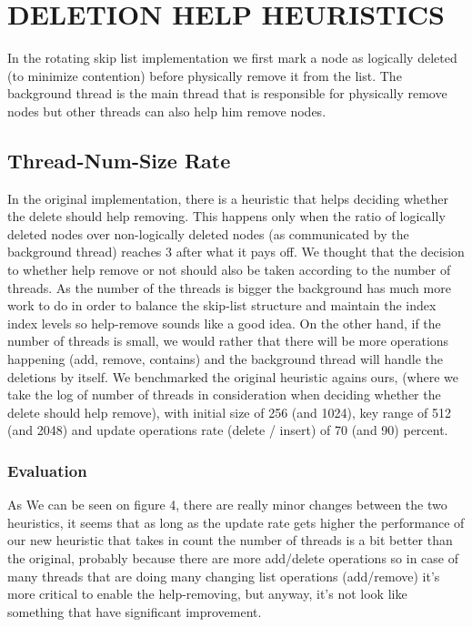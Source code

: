 \documentclass{article}
\begin{document}
\section{DELETION HELP HEURISTICS}
\label{sec:dhh}

In the rotating skip list implementation we first mark a node as logically deleted (to minimize contention) before physically remove it from the list. The background thread is the main thread that is responsible for physically remove nodes but other threads can also help him remove nodes. 

\subsection{Thread-Num-Size Rate}
\label{ssec:tns}

In the original implementation, there is a heuristic that helps deciding whether the delete should help removing. This happens only when the ratio of logically deleted nodes over non-logically deleted nodes (as communicated by the background thread) reaches 3 after what it pays off. We thought that the decision to whether help remove or not should also be taken according to the number of threads. As the number of the threads is bigger the background has much more work to do in order to balance the skip-list structure and maintain the index index levels so help-remove sounds like a good idea. On the other hand, if the number of threads is small, we would rather that there will be more operations happening (add, remove, contains) and the background thread will handle the deletions by itself.
We benchmarked the original heuristic agains ours, (where we take the log of number of threads in consideration when deciding whether the delete should help remove), with initial size of 256 (and 1024), key range of 512 (and 2048) and update operations rate (delete / insert) of 70 (and 90) percent. 

\subsubsection{Evaluation}
\label{sssec:tns-evl}

As We can be seen on figure 4, there are really minor changes between the two heuristics, it seems that as long as the update rate gets higher the performance of our new heuristic that takes in count the number of threads is a bit better than the original, probably because there are more add/delete operations so in case of many threads that are doing many changing list operations (add/remove) it's more critical to enable the help-removing, but anyway, it's not look like something that have significant improvement.
\end{document}
